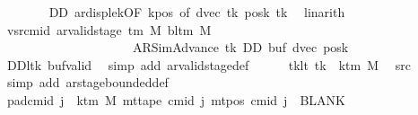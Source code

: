 \begin{isabellebody}
\ \ \ \ \ \ \isamarkupfalse%
\ DD\ ar{\isacharunderscore}{\kern0pt}disp{\isacharunderscore}{\kern0pt}le{\isacharunderscore}{\kern0pt}{}k{\isacharbrackleft}{\kern0pt}OF\ kpos{\isacharcomma}{\kern0pt}\ of\ {\isachardoublequoteopen}dvec\ tk{\isachardoublequoteclose}\ {\isachardoublequoteopen}posk\ tk{\isachardoublequoteclose}{\isacharbrackright}{\kern0pt}\ \isamarkupfalse%
\ linarith\isanewline
\ \ \ \ \isamarkupfalse%
\ vsrcmid{\isacharcolon}{\kern0pt}\ {\isachardoublequoteopen}ar{\isacharunderscore}{\kern0pt}valid{\isacharunderscore}{\kern0pt}stage\ {\isacharparenleft}{\kern0pt}{\isasymGamma}{\isacharunderscore}{\kern0pt}tm\ M{\isacharparenright}{\kern0pt}\ {\isacharparenleft}{\kern0pt}bl{\isacharunderscore}{\kern0pt}tm\ M{\isacharparenright}{\kern0pt}\isanewline
\ \ \ \ \ \ \ \ \ \ \ \ \ \ \ \ \ \ \ \ \ {\isacharparenleft}{\kern0pt}AR{\isacharunderscore}{\kern0pt}SimAdvance{\isacharcomma}{\kern0pt}\ tk{\isacharcomma}{\kern0pt}\ DD{\isacharcomma}{\kern0pt}\ buf{\isacharcomma}{\kern0pt}\ dvec{\isacharcomma}{\kern0pt}\ posk{\isacharparenright}{\kern0pt}{\isachardoublequoteclose}\isanewline
\ \ \ \ \ \ \isamarkupfalse%
\ DD{\isacharunderscore}{\kern0pt}lt{}k\ buf{\isacharunderscore}{\kern0pt}valid\ \isamarkupfalse%
\ {\isacharparenleft}{\kern0pt}simp\ add{\isacharcolon}{\kern0pt}\ ar{\isacharunderscore}{\kern0pt}valid{\isacharunderscore}{\kern0pt}stage{\isacharunderscore}{\kern0pt}def{\isacharparenright}{\kern0pt}\isanewline
\ \ \ \ \isamarkupfalse%
\ tk{\isacharunderscore}{\kern0pt}lt{\isacharcolon}{\kern0pt}\ {\isachardoublequoteopen}tk\ {\isacharless}{\kern0pt}\ k{\isacharunderscore}{\kern0pt}tm\ M{\isachardoublequoteclose}\ \isamarkupfalse%
\ src{}\ \isamarkupfalse%
\ {\isacharparenleft}{\kern0pt}simp\ add{\isacharcolon}{\kern0pt}\ ar{\isacharunderscore}{\kern0pt}stage{\isacharunderscore}{\kern0pt}bounded{\isacharunderscore}{\kern0pt}def{\isacharparenright}{\kern0pt}\isanewline
\ \ \ \ \isamarkupfalse%
\ pad{\isacharunderscore}{\kern0pt}cmid{\isacharcolon}{\kern0pt}\ {\isachardoublequoteopen}{\isasymforall}j\ {\isasymge}\ k{\isacharunderscore}{\kern0pt}tm\ M{\isachardot}{\kern0pt}\ mt{\isacharunderscore}{\kern0pt}tape\ cmid\ j\ {\isacharparenleft}{\kern0pt}mt{\isacharunderscore}{\kern0pt}pos\ cmid\ j{\isacharparenright}{\kern0pt}\ {\isacharequal}{\kern0pt}\ BLANK{}{\isachardoublequoteclose}\isanewline
\ \ \ \ \isamarkupfalse%

\end{isabellebody}
